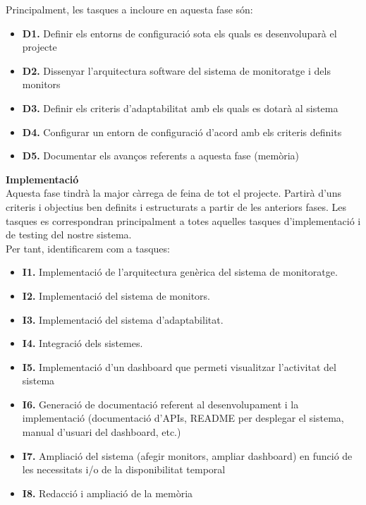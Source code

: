 Principalment, les tasques a incloure en aquesta fase són:

\begin{itemize}
\item \textbf{D1.} Definir els entorns de configuració sota els quals es desenvoluparà el projecte
\item \textbf{D2.} Dissenyar l’arquitectura software del sistema de monitoratge i dels monitors
\item \textbf{D3.} Definir els criteris d’adaptabilitat amb els quals es dotarà al sistema
\item \textbf{D4.} Configurar un entorn de configuració d’acord amb els criteris definits
\item \textbf{D5.} Documentar els avanços referents a aquesta fase (memòria)
\end{itemize}

\noindent \textbf{\large Implementació}\\

\noindent Aquesta fase tindrà la major càrrega de feina de tot el projecte. Partirà d’uns criteris i objectius ben definits i estructurats a partir de les anteriors fases. Les tasques es correspondran principalment a totes aquelles tasques d’implementació i de testing del nostre sistema. \\

Per tant, identificarem com a tasques:

\begin{itemize}
\item \textbf{I1.} Implementació de l’arquitectura genèrica del sistema de monitoratge.
\item \textbf{I2.} Implementació del sistema de monitors.
\item \textbf{I3.} Implementació del sistema d'adaptabilitat.
\item \textbf{I4.} Integració dels sistemes.
\item \textbf{I5.} Implementació d’un dashboard que permeti visualitzar l’activitat del sistema
\item \textbf{I6.} Generació de documentació referent al desenvolupament i la implementació (documentació d’APIs, README per desplegar el sistema, manual d’usuari del dashboard, etc.)
\item \textbf{I7.} Ampliació del sistema (afegir monitors, ampliar dashboard) en funció de les necessitats i/o de la disponibilitat temporal
\item \textbf{I8.} Redacció i ampliació de la memòria
\end{itemize}

